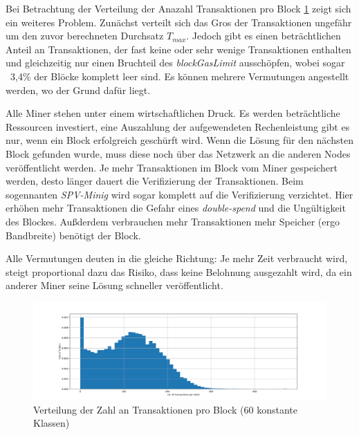 \documentclass[runningheads]{llncs}
\begin{document}
Bei Betrachtung der Verteilung der Anazahl Transaktionen pro Block \ref{blocks_transactions_per_block} zeigt sich ein weiteres Problem. Zunächst verteilt sich das Gros der Transaktionen ungefähr um den zuvor berechneten Durchsatz $ T_{max} $. Jedoch gibt es einen beträchtlichen Anteil an Transaktionen, der fast keine oder sehr wenige Transaktionen enthalten und gleichzeitig nur einen Bruchteil des \textit{blockGasLimit} ausschöpfen, wobei sogar ~3,4\% der Blöcke komplett leer sind. \cite{neemann_appendix_nodate} Es können mehrere Vermutungen angestellt werden, wo der Grund dafür liegt.

Alle Miner stehen unter einem wirtschaftlichen Druck. Es werden beträchtliche Ressourcen investiert, eine Auszahlung der aufgewendeten Rechenleistung gibt es nur, wenn ein Block erfolgreich geschürft wird. Wenn die Lösung für den nächsten Block gefunden wurde, muss diese noch über das Netzwerk an die anderen Nodes veröffentlicht werden. Je mehr Transaktionen im Block vom Miner gespeichert werden, desto länger dauert die Verifizierung der Transaktionen. Beim sogennanten \textit{SPV-Minig} wird sogar komplett auf die Verifizierung verzichtet. \cite{svanevik_why_2018} Hier erhöhen mehr Transaktionen die Gefahr eines \textit{double-spend} und die Ungültigkeit des Blockes. Außderdem verbrauchen mehr Transaktionen mehr Speicher (ergo Bandbreite) benötigt der Block. \cite{research_empty_nodate}

Alle Vermutungen deuten in die gleiche Richtung: Je mehr Zeit verbraucht wird, steigt proportional dazu das Risiko, dass keine Belohnung ausgezahlt wird, da ein anderer Miner seine Lösung schneller veröffentlicht.

\begin{figure}[h!]
  \centerline{\includegraphics[width=18cm, keepaspectratio]{blocks_transactions_per_block.png}}
  \caption{Verteilung der Zahl an Transaktionen pro Block (60 konstante Klassen) \cite{neemann_appendix_nodate}}
  \label{blocks_transactions_per_block}
\end{figure}
\end{document}
